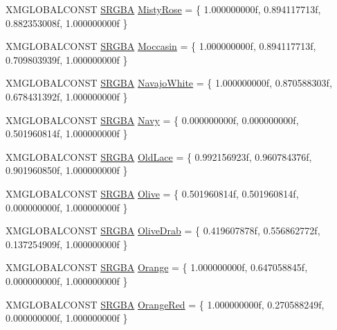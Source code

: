 \begin{DoxyCompactItemize}
\item 
X\+M\+G\+L\+O\+B\+A\+L\+C\+O\+N\+ST \hyperlink{structmage_1_1_s_r_g_b_a}{S\+R\+G\+BA} \hyperlink{namespacemage_1_1color_a6ff7a63a918f5864b0b8e2b3a104ae2c}{Misty\+Rose} = \{ 1.\+000000000f, 0.\+894117713f, 0.\+882353008f, 1.\+000000000f \}
\item 
X\+M\+G\+L\+O\+B\+A\+L\+C\+O\+N\+ST \hyperlink{structmage_1_1_s_r_g_b_a}{S\+R\+G\+BA} \hyperlink{namespacemage_1_1color_a096d11ee65ef4509901ddc3b6c14b689}{Moccasin} = \{ 1.\+000000000f, 0.\+894117713f, 0.\+709803939f, 1.\+000000000f \}
\item 
X\+M\+G\+L\+O\+B\+A\+L\+C\+O\+N\+ST \hyperlink{structmage_1_1_s_r_g_b_a}{S\+R\+G\+BA} \hyperlink{namespacemage_1_1color_a18ab15ea4cd2c7f3da68a72925ec2ad8}{Navajo\+White} = \{ 1.\+000000000f, 0.\+870588303f, 0.\+678431392f, 1.\+000000000f \}
\item 
X\+M\+G\+L\+O\+B\+A\+L\+C\+O\+N\+ST \hyperlink{structmage_1_1_s_r_g_b_a}{S\+R\+G\+BA} \hyperlink{namespacemage_1_1color_a3b7b37c40522972c16f7a929a7d3f82a}{Navy} = \{ 0.\+000000000f, 0.\+000000000f, 0.\+501960814f, 1.\+000000000f \}
\item 
X\+M\+G\+L\+O\+B\+A\+L\+C\+O\+N\+ST \hyperlink{structmage_1_1_s_r_g_b_a}{S\+R\+G\+BA} \hyperlink{namespacemage_1_1color_a4585d8de34bbb038d7f5508fa7116713}{Old\+Lace} = \{ 0.\+992156923f, 0.\+960784376f, 0.\+901960850f, 1.\+000000000f \}
\item 
X\+M\+G\+L\+O\+B\+A\+L\+C\+O\+N\+ST \hyperlink{structmage_1_1_s_r_g_b_a}{S\+R\+G\+BA} \hyperlink{namespacemage_1_1color_ac172a37ab875981c5187f951b30ef49c}{Olive} = \{ 0.\+501960814f, 0.\+501960814f, 0.\+000000000f, 1.\+000000000f \}
\item 
X\+M\+G\+L\+O\+B\+A\+L\+C\+O\+N\+ST \hyperlink{structmage_1_1_s_r_g_b_a}{S\+R\+G\+BA} \hyperlink{namespacemage_1_1color_a0ab436320d35ca9a76712cfba4680dfc}{Olive\+Drab} = \{ 0.\+419607878f, 0.\+556862772f, 0.\+137254909f, 1.\+000000000f \}
\item 
X\+M\+G\+L\+O\+B\+A\+L\+C\+O\+N\+ST \hyperlink{structmage_1_1_s_r_g_b_a}{S\+R\+G\+BA} \hyperlink{namespacemage_1_1color_af8de9ab27c7f398abf1e4bbe62e67a1c}{Orange} = \{ 1.\+000000000f, 0.\+647058845f, 0.\+000000000f, 1.\+000000000f \}
\item 
X\+M\+G\+L\+O\+B\+A\+L\+C\+O\+N\+ST \hyperlink{structmage_1_1_s_r_g_b_a}{S\+R\+G\+BA} \hyperlink{namespacemage_1_1color_af12d9b64fbe74be8503aea6dbd47ad2f}{Orange\+Red} = \{ 1.\+000000000f, 0.\+270588249f, 0.\+000000000f, 1.\+000000000f \}
\item 

\end{DoxyCompactItemize}
